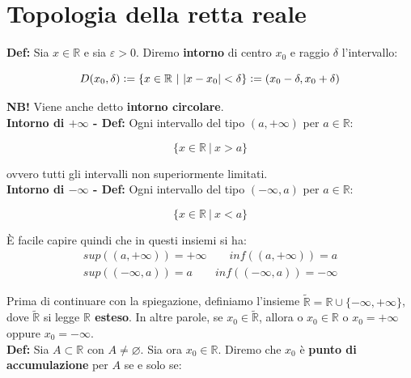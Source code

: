 \documentclass{article}
\begin{document}
\section{Topologia della retta reale}
\textbf{Def:} Sia $x \in \mathbb{R}$ e sia $\varepsilon > 0$. Diremo \textbf{intorno} di centro $x_0$ e raggio $\delta$ l'intervallo: 

\begin{equation*}
    D(x_0, \delta) \vcentcolon = \{x\in\mathbb{R} \ | \ |x - x_0| < \delta\} \vcentcolon = (x_0 - \delta, x_0 + \delta)
\end{equation*}

\noindent\textbf{NB!} Viene anche detto \textbf{intorno circolare}.\\

\noindent\textbf{Intorno di $+\infty$ - Def:} Ogni intervallo del tipo $(a, + \infty)$ per $a \in \mathbb{R}$:

\begin{equation*}
    \{x\in\mathbb{R} \ | \ x > a\}
\end{equation*}

\noindent ovvero tutti gli intervalli non superiormente limitati.\\

\noindent\textbf{Intorno di $-\infty$ - Def:}  Ogni intervallo del tipo $(- \infty, a)$ per $a \in \mathbb{R}$:

\begin{equation*}
    \{x\in\mathbb{R} \ | \ x < a\}
\end{equation*}

\noindent È facile capire quindi che in questi insiemi si ha:
\begin{gather*}
    sup((a, +\infty)) = +\infty \qquad inf((a, +\infty)) = a \\
    sup((-\infty, a)) = a \qquad inf((-\infty, a)) = - \infty
\end{gather*}

\noindent Prima di continuare con la spiegazione, definiamo l'insieme $\widetilde{\mathbb{R}} = \mathbb{R} \cup \{-\infty, +\infty\}$, dove $\widetilde{\mathbb{R}}$ si legge \textbf{$\mathbb{R}$ esteso}. In altre parole, se $x_0 \in \widetilde{\mathbb{R}}$, allora o $x_0 \in \mathbb{R}$ o $x_0 = +\infty$ oppure $x_0 = - \infty$.\\

\noindent \textbf{Def:} Sia $A \subset \mathbb{R}$ con $A \neq \varnothing$. Sia ora $x_0 \in \mathbb{R}$. Diremo che $x_0$ è \textbf{punto di accumulazione} per $A$ se e solo se:
\end{document}
